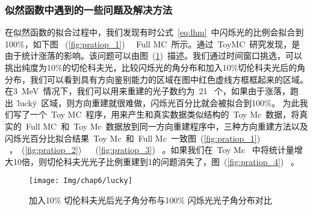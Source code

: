 \subsubsection{似然函数中遇到的一些问题及解决方法}
在似然函数的拟合过程中，我们发现有时公式~\ref{eq:lhm}~中闪烁光的比例会拟合到100\%，如下图
~(\ref{fig:pratiop_1})~ ~Full MC~所示。通过~ToyMC~研究发现，是由于统计涨落的影响。该问题可以由图~(\ref{fig:lucky})~描述。我们通过时间窗口挑选，可以挑出纯度为10\%的切伦科夫光，比较闪烁光的角分布和加入10\%切伦科夫光后的角分布，我们可以看到具有方向鉴别能力的区域在图中红色虚线方框框起来的区域。在3~MeV~情况下，我们可以用来重建的光子数约为~21~ 个，如果由于涨落，跑出~\"lucky\"~区域，则方向重建就很难做，闪烁光百分比就会被拟合到100\%。 为此我们写了一个~Toy MC~程序，用来产生和真实数据类似结构的~Toy Mc~数据，将真实的~Full MC~和~Toy Mc~数据放到同一方向重建程序中，三种方向重建方法以及闪烁光百分比拟合结果~Toy Mc~和~Full Mc~一致图~(\ref{fig:pratiop_1}) ~，~(\ref{fig:pratiop_2}) ~ ~(\ref{fig:pratiop_3}) ~。如果我们在~Toy Mc~ 中将统计量增大10倍，则切伦科夫光光子比例重建到1的问题消失了，图~(\ref{fig:pratiop_4}) ~。\\
\begin{figure}[!htbp]
  \centering
   \texttt{[image: Img/chap6/lucky]}
    \caption{加入10\% 切伦科夫光后光子角分布与100\% 闪烁光光子角分布对比}
  \label{fig:lucky}
\end{figure}

